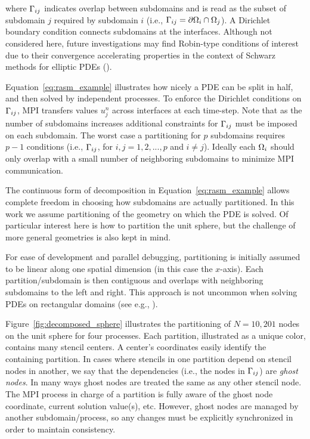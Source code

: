 \documentclass{report}
\begin{document}
\noindent where $\Gamma_{ij}$ indicates overlap between subdomains and is read as the subset of subdomain $j$ required by subdomain $i$ (i.e., $\Gamma_{ij} = \partial\Omega_i \cap \Omega_j$). A Dirichlet boundary condition connects subdomains at the interfaces. Although not considered here, future investigations may find Robin-type conditions of interest due to their convergence accelerating properties in the context of Schwarz methods for elliptic PDEs (\cite{StCyr2007}). 

Equation~\ref{eq:rasm_example} illustrates how nicely a PDE can be split in half, and then solved by independent processes. To enforce the Dirichlet conditions on $\Gamma_{ij}$, MPI transfers values $u_j^{n}$ across interfaces at each time-step. Note that as the number of subdomains increases additional constraints for $\Gamma_{ij}$ must be imposed on each subdomain. The worst case a partitioning for $p$ subdomains requires $p-1$ conditions (i.e., $\Gamma_{ij}$, for $i,j=1,2,...,p$ and $i \neq j$). Ideally each $\Omega_i$ should only overlap with a small number of neighboring subdomains to minimize MPI communication. 


The continuous form of decomposition in Equation~\ref{eq:rasm_example} allows complete freedom in choosing how subdomains are actually partitioned. In this work we assume partitioning of the geometry on which the PDE is solved. Of particular interest here is how to partition the unit sphere, but the challenge of more general geometries is also kept in mind. 

For ease of development and parallel debugging, partitioning is initially
assumed to be linear along one spatial dimension (in this case the $x$-axis). Each partition/subdomain is then contiguous and overlaps with neighboring subdomains to the left and right. This approach is not uncommon when solving PDEs on rectangular domains (see e.g., \cite{Divo2007, Thibault2009}). 


Figure~\ref{fig:decomposed_sphere} illustrates the partitioning of
$N=10,201$ nodes on the unit sphere for four processes. 
Each partition, illustrated as a unique color, contains many stencil centers.  
A center's coordinates easily identify the containing partition. In cases where stencils in one partition depend on stencil nodes in another, we say that the dependencies (i.e., the nodes in $\Gamma_{ij}$) are \emph{ghost nodes}. 
In many ways ghost nodes are treated the same as any other stencil node. The MPI process in charge of a partition is fully aware of the ghost node coordinate, current solution value(s), etc. However, ghost nodes are managed by another subdomain/process, so any changes must be explicitly synchronized in order to maintain consistency. 
\end{document}
